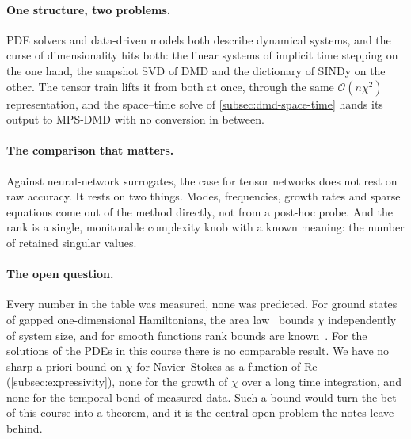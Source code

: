 \paragraph{One structure, two problems.}
PDE solvers and data-driven models both describe dynamical systems, and the
curse of dimensionality hits both: the linear systems of implicit time stepping
on the one hand, the snapshot SVD of DMD and the dictionary of SINDy on the
other. The tensor train lifts it from both at once, through the same
$\mathcal O(n\chi^2)$ representation, and the space--time solve of
\cref{subsec:dmd-space-time} hands its output to MPS-DMD with no conversion in
between.

\paragraph{The comparison that matters.}
Against neural-network surrogates, the case for tensor networks does not rest on
raw accuracy. It rests on two things. Modes, frequencies, growth rates and
sparse equations come out of the method directly, not from a post-hoc probe.
And the rank is a single, monitorable complexity knob with a known meaning: the
number of retained singular values.

\paragraph{The open question.}
Every number in the table was measured, none was predicted. For ground states of
gapped one-dimensional Hamiltonians, the area law~\cite{Hastings2007} bounds
$\chi$ independently of system size, and for smooth functions rank bounds are
known~\cite{Lindsey2023}. For the solutions of the PDEs in this course there is
no comparable result. We have no sharp a-priori bound on $\chi$ for
Navier--Stokes as a function of $\mathrm{Re}$ (\cref{subsec:expressivity}), none
for the growth of $\chi$ over a long time integration, and none for the temporal
bond of measured data. Such a bound would turn the bet of this course into a
theorem, and it is the central open problem the notes leave behind.
